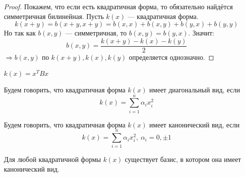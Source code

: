 \documentclass[11pt]{article}
\begin{document}
\begin{proof}
    Покажем, что если есть квадратичная форма, то обязательно найдётся симметричная билинейная. Пусть $k(x)$ --- квадратичная форма.
    \[ k(x+y) = b(x+y, x+y) = b(x,x) + b(x,y) + b(y,x) + b(y,y) \]
    Но так как $b(x,y)$ --- симметричная, то $b(x,y) = b(y,x)$. Значит:
    \[ b(x,y) = \frac{k(x+y)-k(x)-k(y)}{2} \]
    $\Rightarrow b(x,y)$ по $k(x+y),k(x),k(y)$ определяется однозначно.   
\end{proof}

\begin{remark}
    $k(x) = x^TBx$
\end{remark}

\begin{definition}
    Будем говорить, что квадратичная форма $k(x)$ имеет диагональный вид, если
    \[ k(x) = \sum_{i=1}^n \alpha_i x_i^2 \]
\end{definition}

\begin{definition}
    Будем говорить, что квадратичная форма $k(x)$ имеет канонический вид, если
    \[ k(x) = \sum_{i=1}^n \alpha_i x_i^2,\ \alpha_i = 0, \pm 1 \]
\end{definition}


\begin{theorem}
    Для любой квадратичной формы $k(x)$ существует базис, в котором она имеет канонический вид.
\end{theorem}
\end{document}
